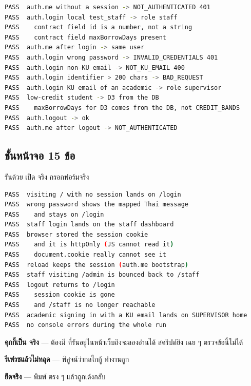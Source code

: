\begin{lstlisting}[language=bash]
PASS  auth.me without a session -> NOT_AUTHENTICATED 401
PASS  auth.login local test_staff -> role staff
PASS    contract field id is a number, not a string
PASS    contract field maxBorrowDays present
PASS  auth.me after login -> same user
PASS  auth.login wrong password -> INVALID_CREDENTIALS 401
PASS  auth.login non-KU email -> NOT_KU_EMAIL 400
PASS  auth.login identifier > 200 chars -> BAD_REQUEST
PASS  auth.login KU email of an academic -> role supervisor
PASS  low-credit student -> D3 from the DB
PASS    maxBorrowDays for D3 comes from the DB, not CREDIT_BANDS
PASS  auth.logout -> ok
PASS  auth.me after logout -> NOT_AUTHENTICATED
\end{lstlisting}

\subsection*{ชั้นหน้าจอ 15 ข้อ}

รันด้วย 
เปิด  จริง กรอกฟอร์มจริง

\begin{lstlisting}[language=bash]
PASS  visiting / with no session lands on /login
PASS  wrong password shows the mapped Thai message
PASS    and stays on /login
PASS  staff login lands on the staff dashboard
PASS  browser stored the session cookie
PASS    and it is httpOnly (JS cannot read it)
PASS    document.cookie really cannot see it
PASS  reload keeps the session (auth.me bootstrap)
PASS  staff visiting /admin is bounced back to /staff
PASS  logout returns to /login
PASS    session cookie is gone
PASS    and /staff is no longer reachable
PASS  academic signing in with a KU email lands on SUPERVISOR home
PASS  no console errors during the whole run
\end{lstlisting}

\begin{keybox}[title={สามข้อในรายการบนที่ทดสอบด้วยวิธีอื่นไม่ได้เลย}]
\textbf{คุกกี้เป็น  จริง} --- ต้องมี 
ที่รันอยู่ในหน้าเว็บถึงจะลองอ่านได้ สคริปต์ยิง  เฉย ๆ ตรวจข้อนี้ไม่ได้

\textbf{รีเฟรชแล้วไม่หลุด} --- พิสูจน์ว่ากลไกกู้  ทำงานถูก

\textbf{ ยึดจริง} --- พิมพ์  ตรง ๆ แล้วถูกเด้งกลับ
\end{keybox}

